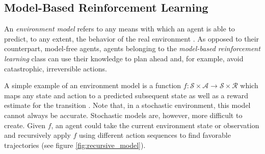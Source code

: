 \subsection{Model-Based Reinforcement Learning}
An \textit{environment model} refers to any means with which an agent is able to predict, to any extent, the behavior of the real environment \cite{bible}. As opposed to their counterpart, model-free agents, agents belonging to the \textit{model-based reinforcement learning} class can use their knowledge to plan ahead and, for example, avoid catastrophic, irreversible actions.

A simple example of an environment model is a function $f : \mathscr{S} \times \mathscr{A} \to \mathscr{S} \times \mathscr{R}$ which maps any state and action to a predicted subsequent state as well as a reward estimate for the transition \cite{model}. Note that, in a stochastic environment, this model cannot always be accurate. Stochastic models are, however, more difficult to create. Given $f$, an agent could take the current environment state or observation and recursively apply $f$ using different action sequences to find favorable trajectories (see figure \ref{fig:recursive_model}).
